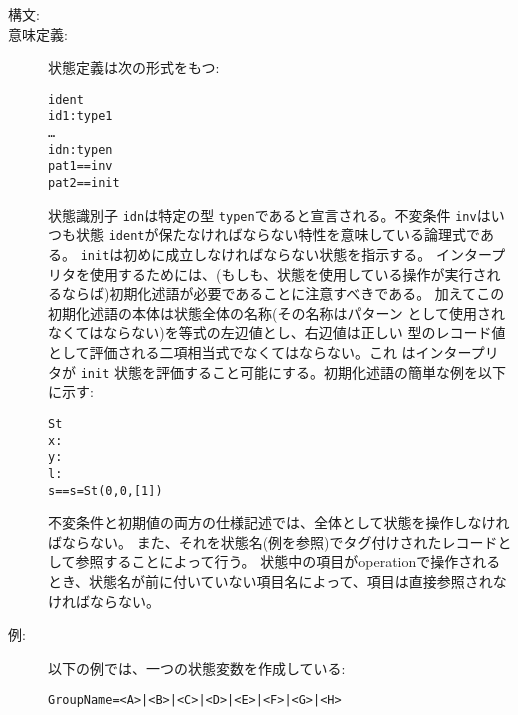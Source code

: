 \documentclass[\pformat,12pt]{jarticle}
\begin{document}
\begin{description}
\item[構文:]




\item[意味定義:] 状態定義は次の形式をもつ:
  \begin{alltt}
     ident 
      id1 : type1
      \ldots
      idn : typen
      pat1 == inv
     pat2 == init
  \end{alltt}
  状態識別子 {\tt idn}は特定の型 {\tt typen}であると宣言される。不変条件 {\tt inv}はいつも状態 {\tt ident}が保たなければならない特性を意味している論理式である。
  {\tt init}は初めに成立しなければならない状態を指示する。
  インタープリタを使用するためには、(もしも、状態を使用している操作が実行されるならば)初期化述語が必要であることに注意すべきである。
  加えてこの初期化述語の本体は状態全体の名称(その名称はパターン
  として使用されなくてはならない)を等式の左辺値とし、右辺値は正しい
  型のレコード値として評価される二項相当式でなくてはならない。これ
  はインタープリタが {\tt init} 状態を評価すること可能にする。初期化述語の簡単な例を以下に示す:

  \begin{alltt}
   St 
    x:
    y:
    l:
   s == s = St(0,0,[1])
  \end{alltt}

  不変条件と初期値の両方の仕様記述では、全体として状態を操作しなければならない。
  また、それを状態名(例を参照)でタグ付けされたレコードとして参照することによって行う。
  状態中の項目がoperationで操作されるとき、状態名が前に付いていない項目名によって、項目は直接参照されなければならない。



\item[例:] 以下の例では、一つの状態変数を作成している:
  \begin{alltt}

  GroupName = <A> | <B> | <C> | <D> | <E> | <F> | <G> | <H>


\end{alltt}
\end{description}
\end{document}
